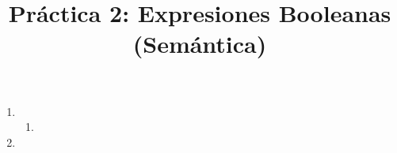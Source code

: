 \documentclass{article}
\author{}
\title{Práctica 2: Expresiones Booleanas (Semántica)}
\begin{document}
\maketitle

\begin{enumerate}
    \item 
	\begin{enumerate}
		\setlength\itemsep{1em}
		\item 
	\end{enumerate}

    \item 
\end{enumerate}
\end{document}
